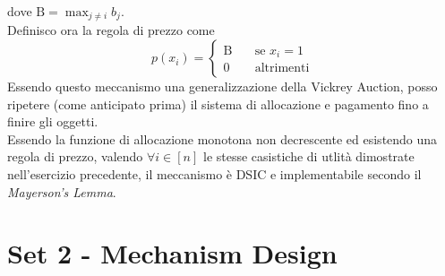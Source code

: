 \documentclass{article}
\begin{document}
            dove $ \text{B} = \max_{j \neq i} b_j $.\\
            Definisco ora la regola di prezzo come
            \[
                p(x_i) = \begin{cases}
                    \text{B}\quad & \text{se } x_i = 1 \\
                    0\quad & \text{altrimenti}
                \end{cases}    
            \]
            Essendo questo meccanismo una generalizzazione della Vickrey Auction, posso ripetere (come anticipato prima) il sistema di allocazione e pagamento fino a finire gli oggetti.\\
            Essendo la funzione di allocazione monotona non decrescente ed esistendo una regola di prezzo, valendo $ \forall i \in [n] $ le stesse casistiche di utlità dimostrate nell'esercizio precedente, il meccanismo è DSIC e implementabile secondo il \textit{Mayerson's Lemma}.
    \newpage
    \section{Set 2 - Mechanism Design}
\end{document}
